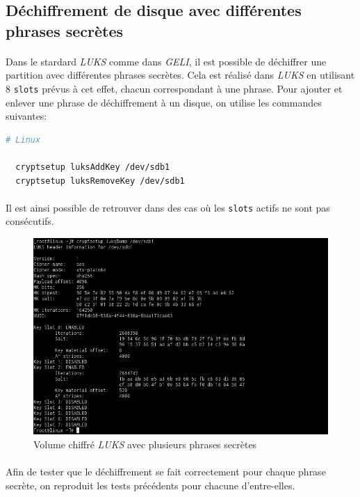 \subsection{Déchiffrement de disque avec différentes phrases secrètes}
\paragraph{}
Dans le stardard \textit{LUKS} comme dans \textit{GELI}, il est possible de
déchiffrer une partition avec différentes phrases secrètes. Cela est réalisé dans
\textit{LUKS} en utilisant 8 \texttt{slots} prévus à cet effet, chacun
correspondant à une phrase.
Pour ajouter et enlever une phrase de déchiffrement à un disque, on utilise les
commandes suivantes:
\\
\begin{lstlisting}[language=bash]
  # Linux

  cryptsetup luksAddKey /dev/sdb1
  cryptsetup luksRemoveKey /dev/sdb1
\end{lstlisting}
\paragraph{}
Il est ainsi possible de retrouver dans des cas où les \texttt{slots} actifs ne
sont pas consécutifs.
\begin{figure}[H]
  \centering
  \includegraphics[width=\linewidth]{tests/linux_multiple_passphrases.png}
  \caption{\label{fig:linux_multiple_passphrases}Volume chiffré \textit{LUKS}
    avec plusieurs phrases secrètes}
\end{figure}
\paragraph{}
Afin de tester que le déchiffrement se fait correctement pour chaque phrase
secrète, on reproduit les tests précédents pour chacune d'entre-elles.
